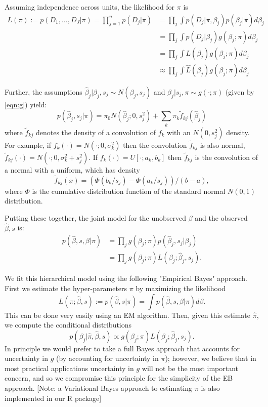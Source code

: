 \documentclass[10pt]{article}
\begin{document}
Assuming independence across units, the likelihood for $\pi$ is 
\begin{align}
L(\pi) := p(D_1,\dots,D_J | \pi) = \prod_{j=1}^n p(D_j | \pi)
& = \prod_j \int p(D_j | \pi, \beta_j) p(\beta_j | \pi) d\beta_j \\
& = \prod_j \int p(D_j | \beta_j) g(\beta_j; \pi) d\beta_j \\
& = \prod_j \int L(\beta_j) g(\beta_j; \pi) d\beta_j \\
& \approx \prod_j \int \hat{L}(\beta_j) g(\beta_j; \pi) d\beta_j
\end{align}

Further, the assumptions  $\hat\beta_j | \beta_j, s_j \sim N(\beta_j,s_j)$ and $\beta_j | s_j, \pi \sim g(\cdot; \pi)$ (given by \ref{eqn:g}) yield: 
\begin{equation}
p(\hat\beta_j, s_j | \pi) = \pi_0 N(\hat\beta_j; 0,s^2_j) + \sum_k \pi_k \tilde{f}_{kj}(\hat\beta_j)
\end{equation}
where $\tilde{f}_{kj}$ denotes the density of a convolution of $f_k$ with an $N(0,s^2_j)$ density.
For example, if $f_k(\cdot) = N(\cdot; 0,\sigma^2_k)$ then the convolution $\tilde{f}_{kj}$ is also normal, $\tilde{f}_{kj}(\cdot) = N(\cdot; 0,\sigma^2_k + s^2_j)$. If
$f_k(\cdot) = U[\cdot; a_k,b_k]$ then $\tilde{f}_{kj}$ is the convolution of a normal with a uniform, which has density
\begin{equation}
\tilde{f}_{kj}(x) = (\Phi(b_k/s_j) - \Phi(a_k/s_j))/(b-a),
\end{equation}
where $\Phi$ is the cumulative distribution function of the standard normal $N(0,1)$ distribution.

Putting these together, the joint model for the unobserved $\beta$ and the observed $\hat\beta, s$ is:
\begin{align}
p(\hat\beta, s, \beta | \pi) & = \prod_j g(\beta_j ; \pi) p(\hat\beta_j, s_j | \beta_j) \\
& = \prod_j g(\beta_j ; \pi) L(\beta_j; \hat\beta_j,s_j).
\end{align}

We fit this hierarchical model using the following "Empirical Bayes" approach. First we estimate the hyper-parameters $\pi$ by maximizing the likelihood
\begin{equation}
L(\pi; \hat\beta, s) := p(\hat\beta, s | \pi) = \int p(\hat\beta, s, \beta | \pi) d\beta.
\end{equation}
This can be done very easily using an EM algorithm.
Then, given this estimate $\hat\pi$, we compute the conditional distributions 
\begin{equation}
p(\beta_j | \hat\pi, \hat\beta, s) \propto g(\beta_j; \pi) L(\beta_j; \hat\beta_j, s_j).
\end{equation} 
In principle we would
prefer to take a full Bayes approach that accounts for uncertainty in $g$ (by accounting for uncertainty in $\pi$); however,
we believe that in most practical applications uncertainty in $g$ will not be the most important concern, and so 
we compromise this principle for the simplicity of the EB approach.
[Note: a Variational Bayes approach to estimating $\pi$ is also implemented in our R package]
\end{document}
